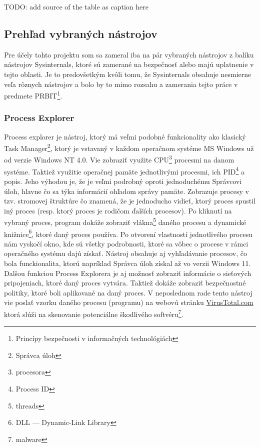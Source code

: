 \documentclass[conference]{IEEEtran}
\begin{document}
TODO: add source of the table as caption here


\subsection{Prehľad vybraných nástrojov}
Pre účely tohto projektu som sa zameral iba na pár vybraných nástrojov z balíku nástrojov Sysinternals, ktoré sú zamerané na bezpečnosť alebo majú uplatnenie v tejto oblasti. Je to predovšetkým kvôli tomu, že Sysinternals obsahuje nesmierne veľa rôznych nástrojov a bolo by to mimo rozsahu a zamerania tejto práce v predmete PRBIT\footnote{Princípy bezpečnosti v informačných technológiách}.
\subsubsection{Process Explorer}
Process explorer je nástroj, ktorý má veľmi podobné funkcionality ako klasický Task Manager\footnote{Správca úloh}, ktorý je vstavaný v každom operačnom systéme MS Windows už od verzie Windows NT 4.0. Vie zobraziť využite CPU\footnote{procesora} procesmi na danom systéme. Taktiež využitie operačnej pamäte jednotlivými procesmi, ich PID\footnote{Process ID} a popis. Jeho výhodou je, že je veľmi podrobný oproti jednoduchému Správcovi úloh, hlavne čo sa týka informácií ohľadom správy pamäte. Zobrazuje procesy v tzv. stromovej štruktúre čo znamená, že je jednoducho vidieť, ktorý proces spustil iný proces (resp. ktorý proces je rodičom ďalších procesov). Po kliknutí na vybraný proces, program dokáže zobraziť vlákna\footnote{threads} daného procesu a dynamické knižnice\footnote{DLL --- Dynamic-Link Library}, ktoré daný proces používa. Po otvorení vlastností jednotlivého procesu nám vyskočí okno, kde sú všetky podrobnosti, ktoré sa vôbec o procese v rámci operačného systému dajú získať. Nástroj obsahuje aj vyhľadávanie procesov, čo bola funckionalita, ktorú napríklad Správca úloh získal až vo verzii Windows 11. Dalšou funkciou Process Explorera je aj možnosť zobraziť informácie o sieťových pripojeniach, ktoré daný proces vytvára. Taktiež dokáže zobraziť bezpečnostné politiky, ktoré boli aplikované na daný proces. V neposlednom rade tento nástroj vie poslať vzorku daného procesu (programu) na webovú stránku \href{https://www.virustotal.com/gui/home/upload}{VirusTotal.com} ktorá slúži na skenovanie potenciálne škodlivého softvéru\footnote{malware}. 
\end{document}
